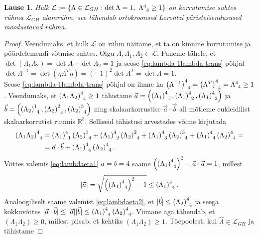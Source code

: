 \documentclass[a4paper,12pt]{article}
\theoremstyle{plain}
\newtheorem{lause}{Lause}[section]
\theoremstyle{definition}
\numberwithin{equation}{section}
\def\R{{\mathbb R}}
\def\L{{\mathcal L}}
\begin{document}
\begin{lause} \label{lause:ryhmL}
Hulk $\L := \{\Lambda \in \L_{GH} : \det \Lambda = 1,\ \Lambda\indices{^4_4} \geq 1\}$ on korrutamise suhtes rühma $\L_{GH}$ alamrühm, see tähendab ortokroonsed Lorentzi päristeisendusused moodustavad rühma.
\end{lause}
\begin{proof}
Veendumaks, et hulk $\L$ on rühm näitame, et ta on kinnine kor\-rutamise ja pöördelemendi võtmise suhtes. Olgu $\Lambda, \Lambda_1, \Lambda_2 \in \L$.
Paneme tähele, et $\det \left(\Lambda_1 \Lambda_2 \right) = \det \Lambda_1 \cdot \det \Lambda_2 = 1$ ja seose \ref{eq:lambda-1lambda-trans} põhjal $\det \Lambda^{-1} = \det \left(\eta \Lambda^T \eta\right) = (-1)^2 \det \Lambda^T = \det \Lambda = 1$. \\
Seose \ref{eq:lambda-1lambda-trans} põhjal on ilmne ka $\left(\Lambda^{-1}\right)\indices{^4_4} = \left(\Lambda^T\right)\indices{^4_4} = \Lambda\indices{^4_4} \geq 1$.
Veendumaks, et $\left(\Lambda_1 \Lambda_2\right)\indices{^4_4} \geq 1$ tähistame $\vec{a} = \left(\left(\Lambda_1\right)\indices{^4_1}, \left(\Lambda_1\right)\indices{^4_2}, \left(\Lambda_1\right)\indices{^4_2}\right)$ 
ja $\vec{b} = \left(\left(\Lambda_2\right)\indices{^1_4}, \left(\Lambda_2\right)\indices{^2_4}, \left(\Lambda_2\right)\indices{^3_4}\right)$ ning skalaarkorrustise $\vec{a} \cdot \vec{b}$ all mõtleme eukleidilist skalaarkorrutist ruumis $\R^3$. Selliseid tähistusi arvestades võime kirjutada
\begin{align*}
\left(\Lambda_1 \Lambda_2\right)\indices{^4_4} &= \left(\Lambda_1\right)\indices{^4_1}\left(\Lambda_2\right)\indices{^1_4} +  \left(\Lambda_1\right)\indices{^4_2}\left(\Lambda_2\right)\indices{^2_4} + \left(\Lambda_1\right)\indices{^4_3}\left(\Lambda_2\right)\indices{^3_4} + \left(\Lambda_1\right)\indices{^4_4}\left(\Lambda_2\right)\indices{^4_4} = \\
&= \vec{a} \cdot \vec{b} + \left(\Lambda_1\right)\indices{^4_4}\left(\Lambda_2\right)\indices{^4_4}.
\end{align*}
Võttes valemis \ref{eq:lambdaeta1} $a = b = 4$ saame $\left(\left(\Lambda_1\right)\indices{^4_4}\right)^2 - \vec{a}\cdot\vec{a} = 1$, millest 
\[|\vec{a}| = \sqrt{\left(\left(\Lambda_1\right)\indices{^4_4}\right)^2 - 1} \leq \left(\Lambda_1\right)\indices{^4_4}.\]
Analoogiliselt saame valemist \ref{eq:lambdaeta2}, et $|\vec{b}| \leq \left(\Lambda_2\right)\indices{^4_4}$ ja seega kokkuvõttes $|\vec{a}\cdot\vec{b}| \leq |\vec{a}||\vec{b}| \leq \left(\Lambda_1\right)\indices{^4_4} \left(\Lambda_2\right)\indices{^4_4}$. Viimane aga tähendab, et $\left(\Lambda_1 \Lambda_2\right) \geq 0$, millest piisab, et kehtiks $\left(\Lambda_1 \Lambda_2\right) \geq 1$. Tõepoolest, kui $\hat{\Lambda} \in \L_{GH}$ ja tähistame 

\end{proof}
\end{document}
